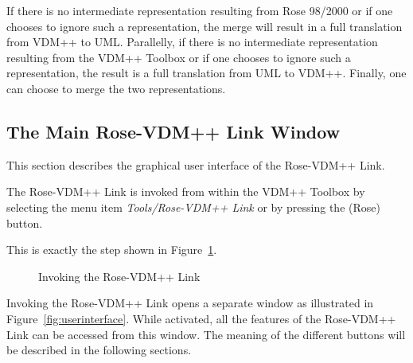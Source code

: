 \documentclass[\pformat,12pt]{article}
\newcommand{\vdmpp}{VDM++}
\newcommand{\link}{Rose-\vdmpp{} Link}
\newcommand{\rose}{Rose 98/2000}
\newcommand{\guicmd}[1]{{\sf #1}}
\begin{document}
If there is no intermediate representation resulting from \rose{} or
if one chooses to ignore such a representation, the merge will result
in a full translation from \vdmpp{} to UML.  Parallelly, if there is
no intermediate representation resulting from the \vdmpp{} Toolbox or
if one chooses to ignore such a representation, the result is a full
translation from UML to \vdmpp{}.  Finally, one can choose to merge
the two representations.

\subsection{The Main Rose-VDM++ Link Window}
\label{main}

This section describes the graphical user interface of the \link{}.

The \link{} is invoked from within the \vdmpp{} Toolbox by selecting the menu   
item {\it Tools/\link{}} or by pressing the 
(\guicmd{Rose}) button.

This is exactly the step shown in
Figure~\ref{fig:toolbox}.

\begin{figure}[htb]
\begin{center}
\mbox{}
\caption{Invoking the \link{}\label{fig:toolbox}}
\end{center}
\end{figure}

Invoking the \link{} opens a separate window as illustrated in Figure~\ref{fig:userinterface}.
While activated, all the features of the \link{} can be accessed from this window.  
The meaning of the different buttons will be described in the following sections.
\end{document}
